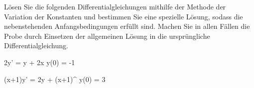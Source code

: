 \begin{atiTask}[
	title = Die Methode der Variation der Konstanten II,
	topic = Gewöhnliche Differentialgleichungen,
	subtopic = Lineare Differentialgleichungen 1. Ordnung,
	language = Deutsch
]
	Lösen Sie die folgenden Differentialgleichungen mithilfe der Methode der Variation der Konstanten und bestimmen Sie eine spezielle Lösung, sodass die nebenstehenden Anfangsbedingungen erfüllt sind.
	Machen Sie in allen Fällen die Probe durch Einsetzen der allgemeinen Lösung in die ursprüngliche Differentialgleichung.
	\begin{atiSubequations}
		\item{
			2y' = y + 2\sin x \separate y(0) = -1
		}
		\item{
			(x+1)y' = 2y + (x+1)^ \separate y(0) = 3
		}
	\end{atiSubequations}
\end{atiTask}